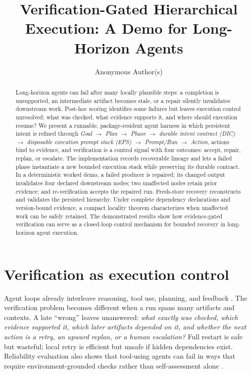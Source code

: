 \documentclass{article}
\title{Verification-Gated Hierarchical Execution: A Demo for Long-Horizon Agents}
\author{Anonymous Author(s)}
\begin{document}
\maketitle

\begin{abstract}
Long-horizon agents can fail after many locally plausible steps: a completion is unsupported, an intermediate artifact becomes stale, or a repair silently invalidates downstream work. Post-hoc scoring identifies some failures but leaves execution control unresolved: what was checked, what evidence supports it, and where should execution resume? We present a runnable, package-resident agent harness in which persistent intent is refined through \emph{Goal $\to$ Plan $\to$ Phase $\to$ durable intent contract (DIC) $\to$ disposable execution prompt stack (EPS) $\to$ Prompt/Run $\to$ Action}, actions bind to evidence, and verification is a control signal with four outcomes: accept, repair, replan, or escalate. The implementation records recoverable lineage and lets a failed phase instantiate a new bounded execution stack while preserving its durable contract. In a deterministic worked demo, a failed producer is repaired; its changed output invalidates four declared downstream nodes; two unaffected nodes retain prior evidence; and re-verification accepts the repaired run. Fresh-store recovery reconstructs and validates the persisted hierarchy. Under complete dependency declarations and version-bound evidence, a compact locality theorem characterizes when unaffected work can be safely retained. The demonstrated results show how evidence-gated verification can serve as a closed-loop control mechanism for bounded recovery in long-horizon agent execution.
\end{abstract}

\section{Verification as execution control}
Agent loops already interleave reasoning, tool use, planning, and feedback \citep{yao2023react,shinn2023reflexion,zhou2024lats}. The verification problem becomes different when a run spans many artifacts and contexts. A late ``wrong'' leaves unanswered: \emph{what exactly was checked, which evidence supported it, which later artifacts depended on it, and whether the next action is a retry, an upward replan, or a human escalation?} Full restart is safe but wasteful; local retry is efficient but unsafe if hidden dependencies exist. Reliability evaluation also shows that tool-using agents can fail in ways that require environment-grounded checks rather than self-assessment alone \citep{debenedetti2024agentdojo}.
\end{document}

